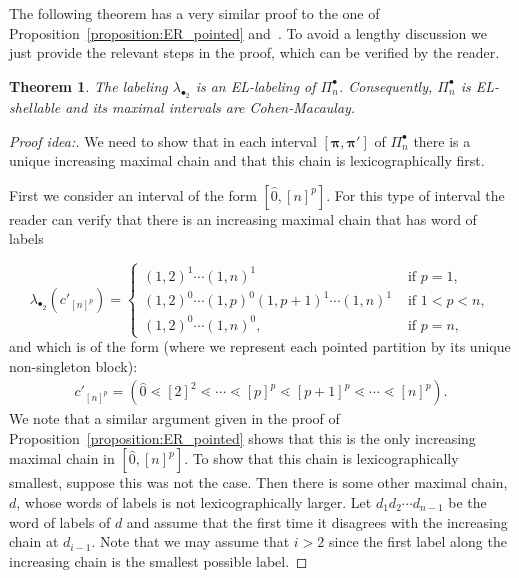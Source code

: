 \documentclass[11pt]{article}
\newtheorem{theo}{Theorem}[section]
\theoremstyle{definition}
\numberwithin{equation}{section}
\newcommand{\bpi}{\pmb{\pi}}
\begin{document}
The following theorem has a very similar proof to the one of Proposition~\ref{proposition:ER_pointed} and~\cite[Theorem 3.2]{GonzalezDleonWachs2016}. To avoid a lengthy discussion we just provide the relevant steps in the proof, which can be verified by the reader.
\begin{theo}\label{theorem:EL-labeling_pointed}
 The labeling $\lambda_{\bullet_2}$ is an EL-labeling of $\Pi_n^{\bullet}$.  Consequently, $\Pi_n^{\bullet}$ is EL-shellable and its maximal intervals are Cohen-Macaulay.
\end{theo}
\begin{proof}[Proof idea:] We need to show that in each interval $[\bpi,\bpi']$ of $\Pi_n^{\bullet}$ there is a unique increasing maximal chain and that this chain is lexicographically first.

First we consider an interval of the form $[\hat{0},[n]^p]$. For this type of interval the reader can verify that there is an  increasing maximal chain  that has word of labels

\begin{equation}\label{equation:increasing_chain_pointed_2}
    \lambda_{\bullet_2}(c' _{[n]^p})=
    \begin{cases}
      (1,2)^{1}\cdots(1,n)^1 & \text{ if } p =1,\\ (1,2)^{0}\cdots(1,p)^0(1,p+1)^1\cdots(1,n)^1 & \text{ if } 1<p<n,\\
       (1,2)^{0}\cdots(1,n)^0, & \text{ if } p=n,
    \end{cases}
 \end{equation}   
 and which is of the form (where we represent each pointed partition by its unique non-singleton block):
\begin{align*}
    c'_{[n]^p}=(\hat{0}\lessdot [2]^2\lessdot \cdots \lessdot [p]^{p} \lessdot [p+1]^{p} \lessdot \cdots \lessdot [n]^{p}).
\end{align*}
We note that a similar argument given in the proof of Proposition~\ref{proposition:ER_pointed} shows that this is the only increasing maximal chain in  $[\hat{0},[n]^p]$. To show that this chain is lexicographically smallest, suppose this was not the case.   Then there is some other maximal chain, $d$, whose words of labels  is not lexicographically larger.  Let $d_1d_2\cdots d_{n-1}$ be the word of labels of $d$ and assume that the first time it disagrees with the increasing chain at $d_{i-1}$. Note that we may assume that $i>2$ since the first label along the increasing chain is the smallest possible label.


\end{proof}
\end{document}
